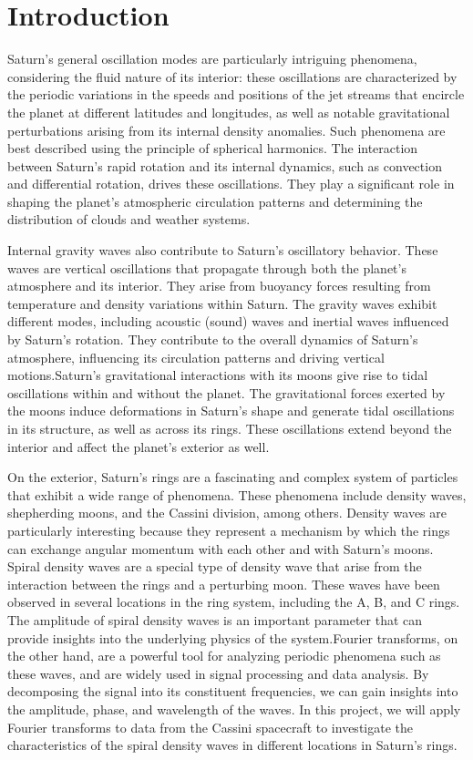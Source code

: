 \documentclass{article}
\begin{document}
\section{Introduction}
Saturn's general oscillation modes are particularly intriguing phenomena, considering the fluid nature of its interior: these oscillations are characterized by the periodic variations in the speeds and positions of the jet streams that encircle the planet at different latitudes and longitudes, as well as notable gravitational perturbations arising from its internal density anomalies. Such phenomena are best described using the principle of spherical harmonics. The interaction between Saturn's rapid rotation and its internal dynamics, such as convection and differential rotation, drives these oscillations. They play a significant role in shaping the planet's atmospheric circulation patterns and determining the distribution of clouds and weather systems.

Internal gravity waves also contribute to Saturn's oscillatory behavior. These waves are vertical oscillations that propagate through both the planet's atmosphere and its interior. They arise from buoyancy forces resulting from temperature and density variations within Saturn. The gravity waves exhibit different modes, including acoustic (sound) waves and inertial waves influenced by Saturn's rotation. They contribute to the overall dynamics of Saturn's atmosphere, influencing its circulation patterns and driving vertical motions.Saturn's gravitational interactions with its moons give rise to tidal oscillations within and without the planet. The gravitational forces exerted by the moons induce deformations in Saturn's shape and generate tidal oscillations in its structure, as well as across its rings. These oscillations extend beyond the interior and affect the planet's exterior as well.

On the exterior, Saturn's rings are a fascinating and complex system of particles that exhibit a wide range of phenomena. These phenomena include density waves, shepherding moons, and the Cassini division, among others. Density waves are particularly interesting because they represent a mechanism by which the rings can exchange angular momentum with each other and with Saturn's moons. Spiral density waves are a special type of density wave that arise from the interaction between the rings and a perturbing moon. These waves have been observed in several locations in the ring system, including the A, B, and C rings. The amplitude of spiral density waves is an important parameter that can provide insights into the underlying physics of the system.Fourier transforms, on the other hand, are a powerful tool for analyzing periodic phenomena such as these waves, and are widely used in signal processing and data analysis. By decomposing the signal into its constituent frequencies, we can gain insights into the amplitude, phase, and wavelength of the waves. In this project, we will apply Fourier transforms to data from the Cassini spacecraft to investigate the characteristics of the spiral density waves in different locations in Saturn's rings.
\end{document}
